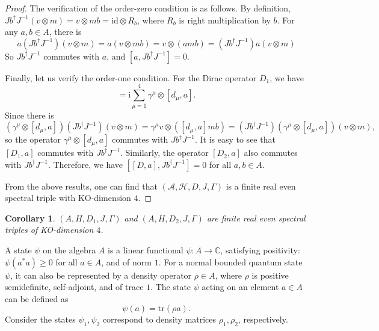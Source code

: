 \documentclass[a4paper,11pt]{article}
\newtheorem{corollary}{Corollary}
\begin{document}
\begin{proof}
  The verification of the order-zero condition is as follows. By definition,
  $Jb^{\dag} J^{- 1}  (v \otimes m) = v \otimes mb = \mathrm{id} \otimes R_b$,
  where $R_b$ is right multiplication by $b$. For any $a, b \in A$, there is
  \begin{equation}
    a(Jb^{\dag} J^{- 1}) (v \otimes m) = a (v \otimes mb)= v \otimes (a mb)=(Jb^{\dag} J^{- 1}) a (v \otimes m)
  \end{equation}
So $Jb^{\dag} J^{- 1}$ commutes with $a$, and $[a, Jb^{\dag} J^{- 1}] = 0$.
  
Finally, let us verify the order-one condition.
For the Dirac operator $D_1$, we have
\begin{equation}
	[D_1,a] = \mathrm{i} \sum_{\mu = 1}^4 \gamma^{\mu} \otimes [d_{\mu},a].
\end{equation}
Since there is
\begin{equation}
    (\gamma^{\mu} \otimes [d_{\mu},a])(Jb^{\dag} J^{- 1}) (v \otimes m) 
    = \gamma^{\mu} v \otimes ([d_{\mu},a]mb)
    =(Jb^{\dag} J^{- 1})(\gamma^{\mu} \otimes [d_{\mu},a]) (v \otimes m),
  \end{equation}
so the operator $\gamma^{\mu} \otimes [d_{\mu},a]$ commutes with $Jb^{\dag} J^{- 1}$. It is easy to see that $[D_1,a]$ commutes with $Jb^{\dag} J^{- 1}$. Similarly, the operator $[D_2,a]$ also commutes with $Jb^{\dag} J^{- 1}$. Therefore, we have $[[D, a], Jb^{\dag} J^{- 1}] = 0$ for all $a, b \in A$.
  
From the above results, one can find that $(\mathcal{A}, \mathcal{H}, D, J, \Gamma)$ is a finite real even spectral triple with KO-dimension $4$.
\end{proof}

\begin{corollary}
  $(A, H, D_1, J, \Gamma)$ and $(A, H, D_2, J, \Gamma)$ are finite real even
  spectral triples of KO-dimension $4$.
\end{corollary}

A state $\psi$ on the algebra $A$ is a linear functional $\psi : A \to
\mathbb{C}$, satisfying positivity: $\psi (a^{\ast} a) \ge 0$ for all $a \in
A$, and of norm $1$. For a normal bounded quantum state $\psi$, it can also be
represented by a density operator $\rho \in A$, where $\rho$ is positive
semidefinite, self-adjoint, and of trace $1$. The state $\psi$ acting on an
element $a \in A$ can be defined as
\begin{equation}
  \psi (a) = \mathrm{tr} (\rho a) .
\end{equation}
Consider the states $\psi_1, \psi_2$ correspond to density matrices
$\rho_1, \rho_2$, respectively.
\end{document}
